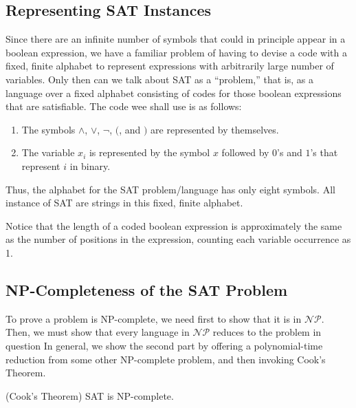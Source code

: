 \documentclass[]{article}
\begin{document}
\subsection*{Representing SAT Instances}
Since there are an infinite number of symbols that could in principle appear in
a boolean expression, we have a familiar problem of having to devise a code with
a fixed, finite alphabet to represent expressions with arbitrarily large number
of variables. Only then can we talk about SAT as a ``problem,'' that is, as a
language over a fixed alphabet consisting of codes for those boolean expressions
that are satisfiable. The code wee shall use is as follows:
\begin{enumerate}
\item The symbols $\wedge$, $\vee$, $\neg$, $($, and $)$ are represented by
themselves.
\item The variable $x_i$ is represented by the symbol $x$ followed by $0$'s and
$1$'s that represent $i$ in binary.
\end{enumerate}
Thus, the alphabet for the SAT problem/language has only eight symbols. All
instance of SAT are strings in this fixed, finite alphabet.

Notice that the length of a coded boolean expression is approximately the same
as the number of positions in the expression, counting each variable occurrence
as 1.

\subsection*{NP-Completeness of the SAT Problem}
To prove a problem is NP-complete, we need first to show that it is in
$\mathcal{NP}$. Then, we must show that every language in $\mathcal{NP}$ reduces
to the problem in question In general, we show the second part by offering a
polynomial-time reduction from some other NP-complete problem, and then invoking
Cook's Theorem.

\begin{thm}
(Cook's Theorem) SAT is NP-complete.
\end{thm}
\end{document}
